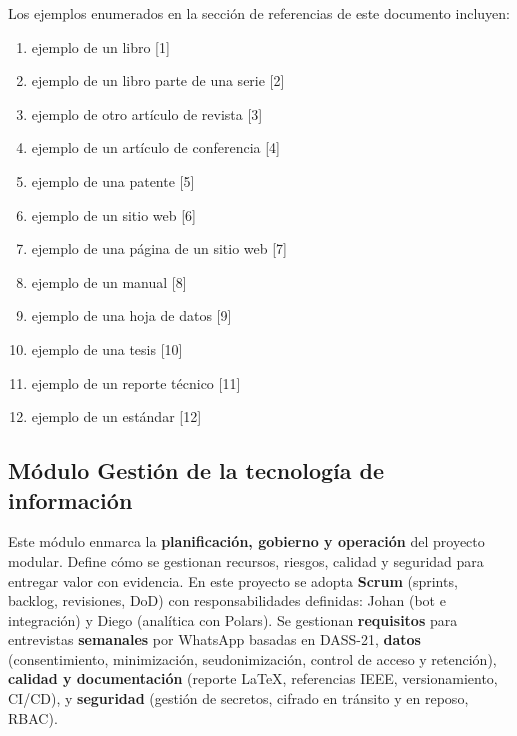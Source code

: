 ﻿\documentclass[10pt,twocolumn]{article}
\begin{document}
Los ejemplos enumerados en la sección de referencias de este documento incluyen:
\begin{enumerate}[leftmargin=*,label=\alph*.)]
  \item ejemplo de un libro [1]
  \item ejemplo de un libro parte de una serie [2]
  \item ejemplo de otro artículo de revista [3]
  \item ejemplo de un artículo de conferencia [4]
  \item ejemplo de una patente [5]
  \item ejemplo de un sitio web [6]
  \item ejemplo de una página de un sitio web [7]
  \item ejemplo de un manual [8]
  \item ejemplo de una hoja de datos [9]
  \item ejemplo de una tesis [10]
  \item ejemplo de un reporte técnico [11]
  \item ejemplo de un estándar [12]
\end{enumerate}

\subsection*{Módulo Gestión de la tecnología de información}
Este módulo enmarca la \textbf{planificación, gobierno y operación} del proyecto modular. Define cómo se gestionan recursos, riesgos, calidad y seguridad para entregar valor con evidencia. En este proyecto se adopta \textbf{Scrum} (sprints, backlog, revisiones, DoD) con responsabilidades definidas: Johan (bot e integración) y Diego (analítica con Polars). Se gestionan \textbf{requisitos} para entrevistas \textbf{semanales} por WhatsApp basadas en DASS{-}21, \textbf{datos} (consentimiento, minimización, seudonimización, control de acceso y retención), \textbf{calidad y documentación} (reporte LaTeX, referencias IEEE, versionamiento, CI/CD), y \textbf{seguridad} (gestión de secretos, cifrado en tránsito y en reposo, RBAC). 
\end{document}
